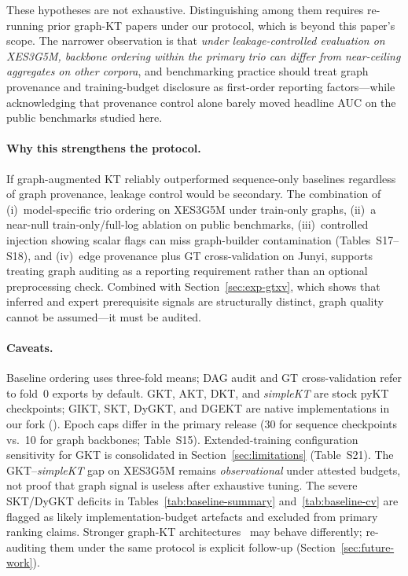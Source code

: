 \documentclass[preprint,10pt,doubleblind]{elsarticle}
\begin{document}
These hypotheses are not exhaustive. Distinguishing among them requires
re-running prior graph-KT papers under our protocol, which is beyond this
paper's scope. The narrower observation is that \emph{under leakage-controlled
evaluation on XES3G5M, backbone ordering within the primary trio can differ
from near-ceiling aggregates on other corpora}, and benchmarking practice
should treat graph provenance and training-budget disclosure as first-order
reporting factors---while acknowledging that provenance control alone barely
moved headline AUC on the public benchmarks studied here.

\paragraph{Why this strengthens the protocol.}
If graph-augmented KT reliably outperformed sequence-only baselines
regardless of graph provenance, leakage control would be secondary. The
combination of (i)~model-specific trio ordering on XES3G5M under train-only
graphs, (ii)~a near-null train-only/full-log ablation on public benchmarks,
(iii)~controlled injection showing scalar flags can miss graph-builder
contamination (Tables~S17--S18), and (iv)~edge provenance plus GT
cross-validation on Junyi, supports treating graph auditing as a reporting
requirement rather than an optional preprocessing check. Combined with Section~\ref{sec:exp-gtxv}, which shows
that inferred and expert prerequisite signals are structurally distinct, graph
quality cannot be assumed---it must be audited.

\paragraph{Caveats.}
Baseline ordering uses three-fold means; DAG audit and GT cross-validation
refer to fold~0 exports by default. GKT, AKT, DKT, and \textit{simpleKT} are
stock pyKT~\cite{liu2022pykt} checkpoints; GIKT, SKT, DyGKT, and DGEKT are
native implementations in our fork (). Epoch caps differ in
the primary release (30 for sequence checkpoints vs.\ 10 for graph backbones;
Table~S15). Extended-training configuration sensitivity for GKT is consolidated
in Section~\ref{sec:limitations} (Table~S21).
The GKT--\textit{simpleKT} gap on XES3G5M remains \emph{observational} under
attested budgets, not proof that graph signal is useless after exhaustive tuning.
The severe SKT/DyGKT deficits in Tables~\ref{tab:baseline-summary}
and~\ref{tab:baseline-cv} are flagged as likely implementation-budget artefacts
and excluded from primary ranking claims. Stronger graph-KT architectures~\cite{tong2020skt,dygkt2024,dgekt2024}
may behave differently; re-auditing them under the same protocol is explicit
follow-up (Section~\ref{sec:future-work}).
\end{document}
